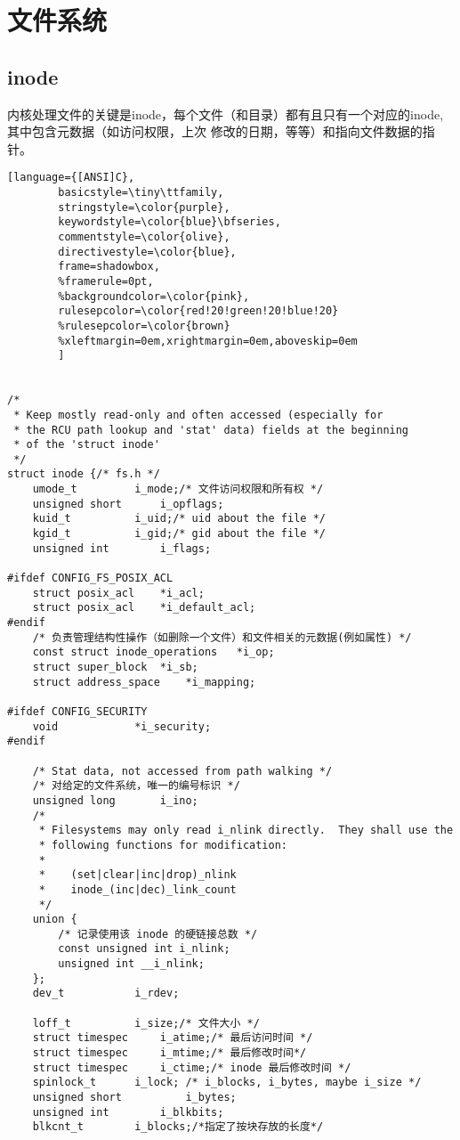 \chapter{文件系统}




\section{inode}

内核处理文件的关键是inode，每个文件（和目录）都有且只有一个对应的inode,其中包含元数据（如访问权限，上次
修改的日期，等等）和指向文件数据的指针。

\begin{lstlisting}[language={[ANSI]C},
        basicstyle=\tiny\ttfamily,
        stringstyle=\color{purple},
        keywordstyle=\color{blue}\bfseries,
        commentstyle=\color{olive},
        directivestyle=\color{blue},
        frame=shadowbox,
        %framerule=0pt,
        %backgroundcolor=\color{pink},
        rulesepcolor=\color{red!20!green!20!blue!20}
        %rulesepcolor=\color{brown}
        %xleftmargin=0em,xrightmargin=0em,aboveskip=0em
        ]


/*
 * Keep mostly read-only and often accessed (especially for
 * the RCU path lookup and 'stat' data) fields at the beginning
 * of the 'struct inode'
 */
struct inode {/* fs.h */
	umode_t			i_mode;/* 文件访问权限和所有权 */
	unsigned short		i_opflags;
	kuid_t			i_uid;/* uid about the file */
	kgid_t			i_gid;/* gid about the file */
	unsigned int		i_flags;

#ifdef CONFIG_FS_POSIX_ACL
	struct posix_acl	*i_acl;
	struct posix_acl	*i_default_acl;
#endif
	/* 负责管理结构性操作（如删除一个文件）和文件相关的元数据(例如属性) */
	const struct inode_operations	*i_op;
	struct super_block	*i_sb;
	struct address_space	*i_mapping;

#ifdef CONFIG_SECURITY
	void			*i_security;
#endif

	/* Stat data, not accessed from path walking */
	/* 对给定的文件系统，唯一的编号标识 */
	unsigned long		i_ino;
	/*
	 * Filesystems may only read i_nlink directly.  They shall use the
	 * following functions for modification:
	 *
	 *    (set|clear|inc|drop)_nlink
	 *    inode_(inc|dec)_link_count
	 */
	union {
		/* 记录使用该 inode 的硬链接总数 */
		const unsigned int i_nlink;
		unsigned int __i_nlink;
	};
	dev_t			i_rdev;
	
	loff_t			i_size;/* 文件大小 */
	struct timespec		i_atime;/* 最后访问时间 */
	struct timespec		i_mtime;/* 最后修改时间*/
	struct timespec		i_ctime;/* inode 最后修改时间 */
	spinlock_t		i_lock;	/* i_blocks, i_bytes, maybe i_size */
	unsigned short          i_bytes;
	unsigned int		i_blkbits;
	blkcnt_t		i_blocks;/*指定了按块存放的长度*/


\end{lstlisting}
